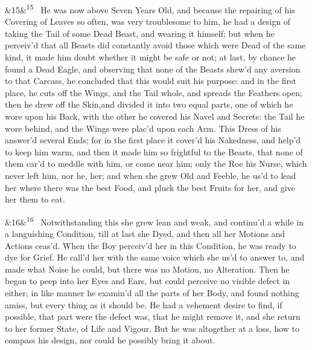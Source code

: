 \documentclass[12pt]{article}
\newcommand{\para}[1][]{\par\noindent\ifx&#1&\else\textsuperscript{\footnotesize #1}~\fi}
\begin{document}
\para[15] He was now above Seven Years Old, and because the repairing of his Covering of Leaves so often, was very troublesome to him, he had a design of taking the Tail of some Dead Beast, and wearing it himself; but when he perceiv'd that all Beasts did constantly avoid those which were Dead of the same kind, it made him doubt whether it might be safe or not; at last, by chance he found a Dead Eagle, and observing that none of the Beasts shew'd any aversion to that Carcass, he concluded that this would suit his purpose: and in the first place, he cuts off the Wings, and the Tail whole, and spreads the Feathers open; then he drew off the Skin,and divided it into two equal parts, one of which he wore upon his Back, with the other he covered his Navel and Secrets: the Tail he wore behind, and the Wings were plac'd upon each Arm. This Dress of his answer'd several Ends; for in the first place it cover'd his Nakedness, and help'd to keep him warm, and then it made him so frightful to the Beasts, that none of them car'd to meddle with him, or come near him; only the Roe his Nurse, which never left him, nor he, her; and when she grew Old and Feeble, he us'd to lead her where there was the best Food, and pluck the best Fruits for her, and give her them to eat.

\para[16] Notwithstanding this she grew lean and weak, and continu'd a while in a languishing Condition, till at last she Dyed, and then all her Motions and Actions ceas'd. When the Boy perceiv'd her in this Condition, he was ready to dye for Grief. He call'd her with the same voice which she us'd to answer to, and made what Noise he could, but there was no Motion, no Alteration. Then he began to peep into her Eyes and Ears, but could perceive no visible defect in either; in like manner he examin'd all the parts of her Body, and found nothing amiss, but every thing as it should be. He had a vehement desire to find, if possible, that part were the defect was, that he might remove it, and she return to her former State, of Life and Vigour. But he was altogether at a loss, how to compass his design, nor could he possibly bring it about.
\end{document}
